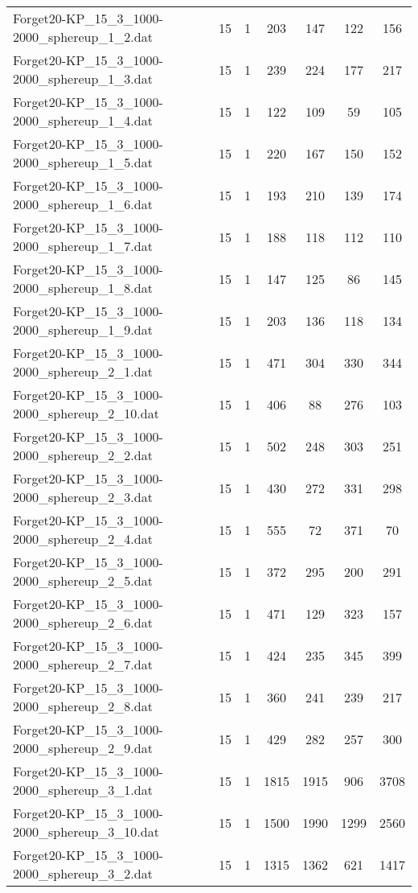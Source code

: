 \begin{table}[!ht]
\begin{tabular}{lcccccc}
Forget20-KP\_15\_3\_1000-2000\_sphereup\_1\_2.dat & 15 & 1 & 203 & 147 & 122 & 156 \\
Forget20-KP\_15\_3\_1000-2000\_sphereup\_1\_3.dat & 15 & 1 & 239 & 224 & 177 & 217 \\
Forget20-KP\_15\_3\_1000-2000\_sphereup\_1\_4.dat & 15 & 1 & 122 & 109 & 59 & 105 \\
Forget20-KP\_15\_3\_1000-2000\_sphereup\_1\_5.dat & 15 & 1 & 220 & 167 & 150 & 152 \\
Forget20-KP\_15\_3\_1000-2000\_sphereup\_1\_6.dat & 15 & 1 & 193 & 210 & 139 & 174 \\
Forget20-KP\_15\_3\_1000-2000\_sphereup\_1\_7.dat & 15 & 1 & 188 & 118 & 112 & 110 \\
Forget20-KP\_15\_3\_1000-2000\_sphereup\_1\_8.dat & 15 & 1 & 147 & 125 & 86 & 145 \\
Forget20-KP\_15\_3\_1000-2000\_sphereup\_1\_9.dat & 15 & 1 & 203 & 136 & 118 & 134 \\
Forget20-KP\_15\_3\_1000-2000\_sphereup\_2\_1.dat & 15 & 1 & 471 & 304 & 330 & 344 \\
Forget20-KP\_15\_3\_1000-2000\_sphereup\_2\_10.dat & 15 & 1 & 406 & 88 & 276 & 103 \\
Forget20-KP\_15\_3\_1000-2000\_sphereup\_2\_2.dat & 15 & 1 & 502 & 248 & 303 & 251 \\
Forget20-KP\_15\_3\_1000-2000\_sphereup\_2\_3.dat & 15 & 1 & 430 & 272 & 331 & 298 \\
Forget20-KP\_15\_3\_1000-2000\_sphereup\_2\_4.dat & 15 & 1 & 555 & 72 & 371 & 70 \\
Forget20-KP\_15\_3\_1000-2000\_sphereup\_2\_5.dat & 15 & 1 & 372 & 295 & 200 & 291 \\
Forget20-KP\_15\_3\_1000-2000\_sphereup\_2\_6.dat & 15 & 1 & 471 & 129 & 323 & 157 \\
Forget20-KP\_15\_3\_1000-2000\_sphereup\_2\_7.dat & 15 & 1 & 424 & 235 & 345 & 399 \\
Forget20-KP\_15\_3\_1000-2000\_sphereup\_2\_8.dat & 15 & 1 & 360 & 241 & 239 & 217 \\
Forget20-KP\_15\_3\_1000-2000\_sphereup\_2\_9.dat & 15 & 1 & 429 & 282 & 257 & 300 \\
Forget20-KP\_15\_3\_1000-2000\_sphereup\_3\_1.dat & 15 & 1 & 1815 & 1915 & 906 & 3708 \\
Forget20-KP\_15\_3\_1000-2000\_sphereup\_3\_10.dat & 15 & 1 & 1500 & 1990 & 1299 & 2560 \\
Forget20-KP\_15\_3\_1000-2000\_sphereup\_3\_2.dat & 15 & 1 & 1315 & 1362 & 621 & 1417 \\

\end{tabular}
\end{table}
